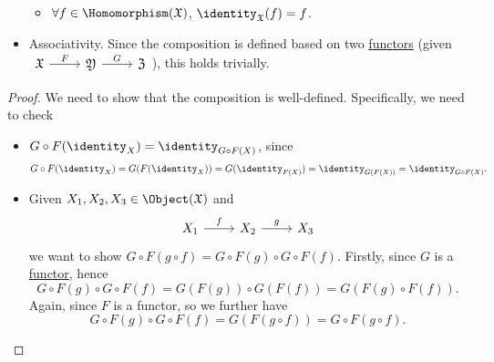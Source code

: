 \begin{definition}
\begin{itemize}
\begin{itemize}
			      \item \(\forall f\in \Homomorphism (\mathfrak{X})\), \(\identity_{\mathfrak{X}}(f) = f \).
		      \end{itemize}
		\item Associativity. Since the composition is defined based on two \hyperref[def:functor]{functors} (given \(\begin{tikzcd}
			      {\mathfrak{X}} & {\mathfrak{Y}} & {\mathfrak{Z}}
			      \arrow["F", from=1-1, to=1-2]
			      \arrow["G", from=1-2, to=1-3]
		      \end{tikzcd}\)), this holds trivially.
	\end{itemize}
\end{definition}
\begin{proof}
	We need to show that the composition is well-defined. Specifically, we need to check
	\begin{itemize}
		\item \(G\circ F(\identity_{X}) = \identity_{G\circ F(X)}\), since
		      \[
			      G\circ F(\identity_{X} ) = G(F(\identity_{X} )) = G(\identity_{F(X)}) = \identity_{G(F(X))} = \identity_{G\circ F(X)}.
		      \]
		\item Given \(X_1, X_2, X_3\in \Object (\mathfrak{X})\) and
		      \[
			      \begin{tikzcd}
				      {X_1} & {X_2} & {X_3}
				      \arrow["f", from=1-1, to=1-2]
				      \arrow["g", from=1-2, to=1-3]
			      \end{tikzcd}
		      \]
		      we want to show \(G\circ F(g\circ f) = G\circ F(g) \circ G\circ F(f)\). Firstly, since \(G\) is a \hyperref[def:functor]{functor}, hence
		      \[
			      G\circ F(g) \circ G\circ F(f) = G(F(g))	\circ G(F(f)) = G\left(F(g)\circ F(f)\right).
		      \]
		      Again, since \(F\) is a functor, so we further have
		      \[
			      G\circ F(g) \circ G\circ F(f) = G(F(g\circ f)) = G\circ F(g\circ f).
		      \]
	\end{itemize}
\end{proof}
